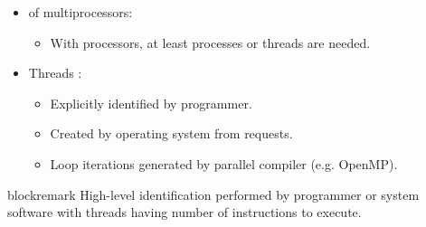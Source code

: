 \begin{frame}[t]
\begin{itemize}
  \item {} of multiprocessors:
    \begin{itemize}
      \item With  processors, at least 
             processes or threads are needed.
    \end{itemize}

  \item Threads :
    \begin{itemize}
      \item Explicitly identified by programmer.
      \item Created by operating system from requests.
      \item Loop iterations generated by parallel compiler (e.g. OpenMP).
    \end{itemize}
\end{itemize}

\begin{beamercolorbox}[sep=1em,wd=\textwidth]{blockremark}
High-level identification performed by programmer or system software with
threads having  number of instructions to execute.
\end{beamercolorbox}

\end{frame}

